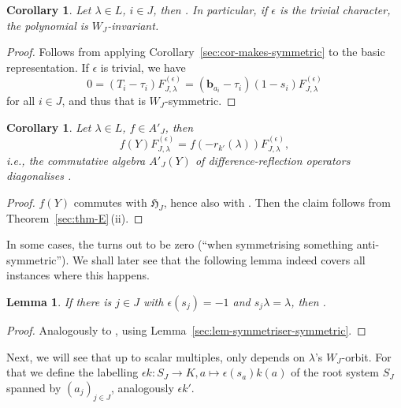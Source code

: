 \documentclass[10pt,a4paper]{amsart}
\newtheorem{Lemma}[Theorem]{Lemma}
\newtheorem{Corollary}[Theorem]{Corollary}
\theoremstyle{definition}
\numberwithin{equation}{section}
\begin{document}
\begin{Corollary}
 Let $\lambda\in L$, $i\in J$, then
.
 In particular, if $\epsilon$ is the trivial character, the polynomial
  is $W_J$-invariant.
\end{Corollary}
\begin{proof}
 Follows from applying Corollary~\ref{sec:cor-makes-symmetric} to
 the basic representation. If $\epsilon$ is trivial, we have%
 \[
 0 = (T_i-\tau_i)F^{(\epsilon)}_{J,\lambda}
 = (\bm{b}_{a_i} - \tau_i)(1-s_i)F^{(\epsilon)}_{J,\lambda}
 \]
 for all $i\in J$, and thus that  is $W_J$-symmetric.
\end{proof}

\begin{Corollary}
 Let $\lambda\in L$, $f\in A'_J$, then
 \[
 f(Y)F^{(\epsilon)}_{J,\lambda} = f(-r_{k'}(\lambda)) F^{(\epsilon)}_{J,\lambda},
 \]
 i.e., the commutative algebra $A'_J(Y)$ of difference-reflection operators
 diagonalises .
\end{Corollary}
\begin{proof}
 $f(Y)$ commutes with $\mathfrak{H}_J$, hence also with . Then the claim follows from Theo\-rem~\ref{sec:thm-E}\,(ii).
\end{proof}

In some cases, the  turns out to be zero
(``when symmetrising something anti-symmetric''). We shall later see
that the following lemma indeed covers all instances where this happens.

\begin{Lemma}\label{sec:lem-F-vanishes}
 If there is $j\in J$ with $\epsilon(s_j)=-1$ and $s_j\lambda=\lambda$, then
 .
\end{Lemma}
\begin{proof}
 Analogously to \cite[Section~5.7.1]{macdonald},
 using Lemma~\ref{sec:lem-symmetriser-symmetric}.
\end{proof}

Next, we will see that up to scalar multiples, 
only depends on
$\lambda$'s $W_J$-orbit. For that we define the labelling
$
 \epsilon k\colon S_J\to K, a\mapsto \epsilon(s_a)k(a)
$
of the root system $S_J$ spanned by $(a_j)_{j\in J}$, analogously $\epsilon k'$.
\end{document}
